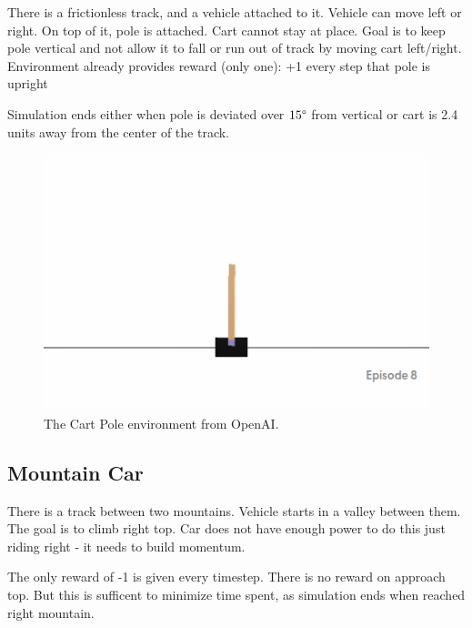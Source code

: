 \documentclass[12pt]{article}
\begin{document}
There is a frictionless track, and a vehicle attached to it. Vehicle can move left or right. On top of it, pole is attached. Cart cannot stay at place. Goal is to keep pole vertical and not allow it to fall or run out of track by moving cart left/right. Environment already provides reward (only one): +1 every step that pole is upright

Simulation ends either when pole is deviated over $15\degree$ from vertical or cart is 2.4 units away from the center of the track.

\begin{figure}[h]
\includegraphics[width=\textwidth]{cartpole_intro.png} 
\centering
\caption{The Cart Pole environment from OpenAI.}
\end{figure}


\subsection{Mountain Car}
There is a track between two mountains. Vehicle starts in a valley between them. The goal is to climb right top. Car does not have enough power to do this just riding right - it needs to build momentum. 

The only reward of -1 is given every timestep. There is no reward on approach top. But this is sufficent to minimize time spent, as simulation ends when reached right mountain.
\end{document}
